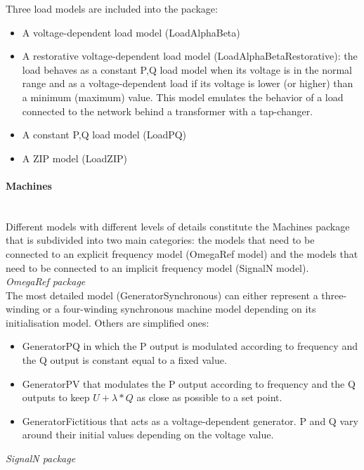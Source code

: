 \documentclass[a4paper, 12pt]{report}
\begin{document}
Three load models are included into the package:
\begin{itemize}
\item A voltage-dependent load model (LoadAlphaBeta)
\item A restorative voltage-dependent load model (LoadAlphaBetaRestorative): the load behaves as a constant P,Q load model when its voltage is in the normal range and as a voltage-dependent load if its voltage is lower (or higher) than a minimum (maximum) value. This model emulates the behavior of a load connected to the network behind a transformer with a tap-changer.
\item A constant P,Q load  model (LoadPQ)
\item A ZIP model (LoadZIP)
\end{itemize}

\paragraph{Machines}
~~\\

Different models with different levels of details constitute the Machines package that is subdivided into two main categories: the models that need to be connected to an explicit frequency model (OmegaRef model) and the models that need to be connected to an implicit frequency model (SignalN model). \\

\textit{OmegaRef package} \\

The most detailed model (GeneratorSynchronous) can either represent a three-winding or a four-winding synchronous machine model depending on its initialisation model. Others are simplified ones:
\begin{itemize}
\item GeneratorPQ in which the P output is modulated according to frequency and the Q output is constant equal to a fixed value.
\item GeneratorPV that modulates the P output according to frequency and the Q outputs to keep $U + \lambda * Q$ as close as possible to a set point.
\item GeneratorFictitious that acts as a voltage-dependent generator. P and Q vary around their initial values depending on the voltage value.
\end{itemize}
\medskip

\textit{SignalN package} \\
\end{document}
